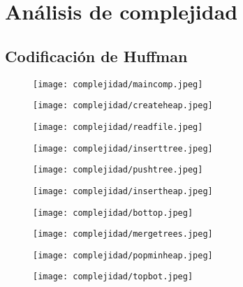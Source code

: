 \documentclass[12 pt]{report}
\begin{document}
\section*{Análisis de complejidad}
\subsection*{Codificación de Huffman}
\begin{figure}[h!]
  \centering
  \texttt{[image: complejidad/maincomp.jpeg]}
  \caption{\label{fig:Main de la codificación}}
\end{figure}
\newpage
\begin{figure}[h!]
  \texttt{[image: complejidad/createheap.jpeg]}
  \caption{\label{fig:Reservar el espacio del montículo} }
\end{figure}
\begin{figure}[h!]
  \texttt{[image: complejidad/readfile.jpeg]}
  \caption{\label{fig:Leer bytes del archivo original}}
\end{figure}
\newpage
\begin{figure}[h!]
  \texttt{[image: complejidad/inserttree.jpeg]}
  \caption{\label{fig:Insertar nodos en la cola de prioridad} }
\end{figure}
\begin{figure}[h!]
  \texttt{[image: complejidad/pushtree.jpeg]}
  \caption{\label{fig:Insertar datos en los nodos} }
\end{figure}
\begin{figure}[h!]
  \texttt{[image: complejidad/insertheap.jpeg]}
  \caption{\label{fig:Insercion en la cola de prioridad} }
\end{figure}
\newpage
\begin{figure}[h!]
  \texttt{[image: complejidad/bottop.jpeg]}
  \caption{\label{fig:Hacer bottom top al montículo} }
\end{figure}
\begin{figure}[h!]
  \texttt{[image: complejidad/mergetrees.jpeg]}
  \caption{\label{fig:Unir todos los arboles en uno principal} }
\end{figure}
\begin{figure}[h!]
  \texttt{[image: complejidad/popminheap.jpeg]}
  \caption{\label{fig:Eliminar y devolver el menor elemento de la cola} }
\end{figure}
\newpage
\begin{figure}[h!]
  \texttt{[image: complejidad/topbot.jpeg]}
  \caption{\label{fig:Hacer top bottom al montículo} }
\end{figure}
\end{document}
